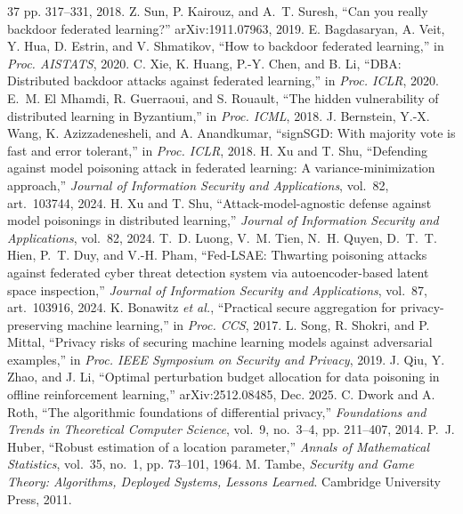 \documentclass[final,1p,times]{elsarticle}
\newcommand{\etal}{\emph{et al.}}
\begin{document}
\begin{thebibliography}{37}
pp. 317--331, 2018.
Z. Sun, P. Kairouz, and A.~T. Suresh, ``Can you really backdoor
federated learning?'' arXiv:1911.07963, 2019.
E. Bagdasaryan, A. Veit, Y. Hua, D. Estrin, and V. Shmatikov, ``How to
backdoor federated learning,'' in \emph{Proc. AISTATS}, 2020.
C. Xie, K. Huang, P.-Y. Chen, and B. Li, ``DBA: Distributed backdoor
attacks against federated learning,'' in \emph{Proc. ICLR}, 2020.
E.~M. El Mhamdi, R. Guerraoui, and S. Rouault, ``The hidden
vulnerability of distributed learning in Byzantium,'' in
\emph{Proc. ICML}, 2018.
J. Bernstein, Y.-X. Wang, K. Azizzadenesheli, and A. Anandkumar,
``signSGD: With majority vote is fast and error tolerant,'' in
\emph{Proc. ICLR}, 2018.
H. Xu and T. Shu, ``Defending against model poisoning attack in
federated learning: A variance-minimization approach,'' \emph{Journal
of Information Security and Applications}, vol.~82, art.~103744, 2024.
H. Xu and T. Shu, ``Attack-model-agnostic defense against model
poisonings in distributed learning,'' \emph{Journal of Information
Security and Applications}, vol.~82, 2024.
T.~D. Luong, V.~M. Tien, N.~H. Quyen, D.~T.~T. Hien, P.~T. Duy, and
V.-H. Pham, ``Fed-LSAE: Thwarting poisoning attacks against federated
cyber threat detection system via autoencoder-based latent space
inspection,'' \emph{Journal of Information Security and Applications},
vol.~87, art.~103916, 2024.
K. Bonawitz \etal, ``Practical secure aggregation for privacy-preserving
machine learning,'' in \emph{Proc. CCS}, 2017.
L. Song, R. Shokri, and P. Mittal, ``Privacy risks of securing machine
learning models against adversarial examples,'' in \emph{Proc. IEEE
Symposium on Security and Privacy}, 2019.
J. Qiu, Y. Zhao, and J. Li, ``Optimal perturbation budget allocation for
data poisoning in offline reinforcement learning,'' arXiv:2512.08485,
Dec. 2025.
C. Dwork and A. Roth, ``The algorithmic foundations of differential
privacy,'' \emph{Foundations and Trends in Theoretical Computer
Science}, vol.~9, no.~3--4, pp. 211--407, 2014.
P.~J. Huber, ``Robust estimation of a location parameter,'' \emph{Annals
of Mathematical Statistics}, vol.~35, no.~1, pp. 73--101, 1964.
M. Tambe, \emph{Security and Game Theory: Algorithms, Deployed Systems,
Lessons Learned}. Cambridge University Press, 2011.
\end{thebibliography}
\end{document}
